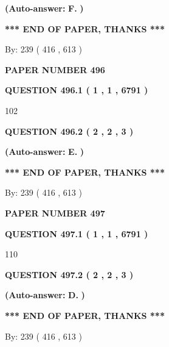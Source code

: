\documentclass{ctexart}
\begin{document}
 
{\textbf{(Auto-answer:}}
{\textbf{\large{
F.}}}
{\textbf{)}}
 
 
   
   
   
   
\vspace{1.0in} 
{\textbf{\large{ *** END OF PAPER, THANKS *** }}} 
   
   
\hspace{1.0in} By: 
 239 ( 416 ,  613 )
   
   
   
   
\newpage 
\setcounter{page}{ 
   496001 } 
   
   
 {\textbf{ \Large{ PAPER NUMBER  496  }}}
   
   
   
   
  
  
{\textbf{\large{QUESTION
496.1 
 ( 1 , 1 , 6791 )
}}}

102
  
  
{\textbf{\large{QUESTION
496.2 
 ( 2 , 2 , 3 )
}}}
 
 
{\textbf{(Auto-answer:}}
{\textbf{\large{
E.}}}
{\textbf{)}}
 
 
   
   
   
   
\vspace{1.0in} 
{\textbf{\large{ *** END OF PAPER, THANKS *** }}} 
   
   
\hspace{1.0in} By: 
 239 ( 416 ,  613 )
   
   
   
   
\newpage 
\setcounter{page}{ 
   497001 } 
   
   
 {\textbf{ \Large{ PAPER NUMBER  497  }}}
   
   
   
   
  
  
{\textbf{\large{QUESTION
497.1 
 ( 1 , 1 , 6791 )
}}}

110
  
  
{\textbf{\large{QUESTION
497.2 
 ( 2 , 2 , 3 )
}}}
 
 
{\textbf{(Auto-answer:}}
{\textbf{\large{
D.}}}
{\textbf{)}}
 
 
   
   
   
   
\vspace{1.0in} 
{\textbf{\large{ *** END OF PAPER, THANKS *** }}} 
   
   
\hspace{1.0in} By: 
 239 ( 416 ,  613 )
   
   
   
\end{document}
